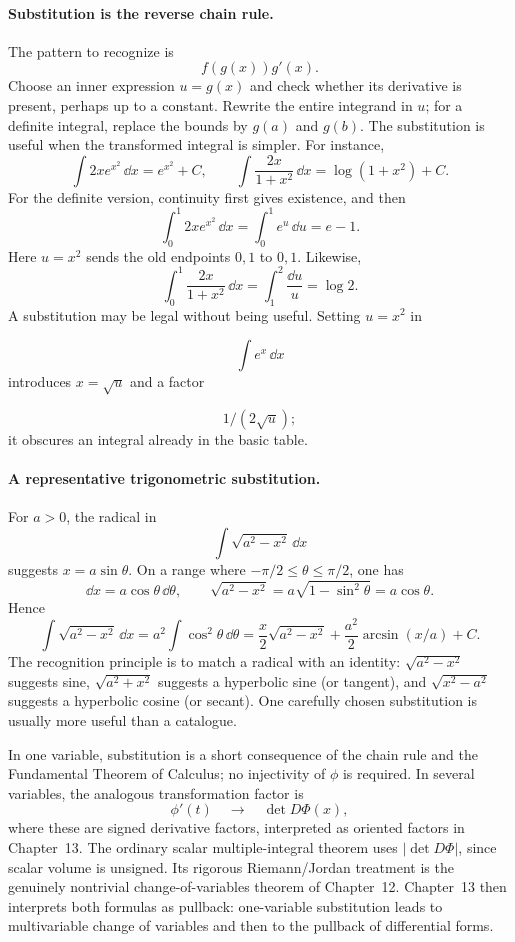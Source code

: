 \paragraph{Substitution is the reverse chain rule.}
The pattern to recognize is
\[
f(g(x))g'(x).
\]
Choose an inner expression $u=g(x)$ and check whether its derivative is
present, perhaps up to a constant. Rewrite the entire integrand in $u$;
for a definite integral, replace the bounds by $g(a)$ and $g(b)$. The
substitution is useful when the transformed integral is simpler.
For instance,
\[
\int 2x e^{x^2}\,\dd x=e^{x^2}+C,
\qquad
\int\frac{2x}{1+x^2}\,\dd x=\log(1+x^2)+C.
\]
For the definite version, continuity first gives existence, and then
\[
\int_0^1 2x e^{x^2}\,\dd x
=\int_0^1 e^u\,\dd u
=e-1.
\]
Here \(u=x^2\) sends the old endpoints \(0,1\) to \(0,1\). Likewise,
\[
\int_0^1\frac{2x}{1+x^2}\,\dd x
=\int_1^2\frac{\dd u}{u}
=\log2.
\]
A substitution may be legal without being useful. Setting \(u=x^2\) in

\[
\int e^x\,\dd x
\]
 introduces \(x=\sqrt u\) and a factor

\[
1/(2\sqrt u);
\]
 it obscures an integral already in the basic table.

\paragraph{A representative trigonometric substitution.}
For \(a>0\), the radical in
\[
\int\sqrt{a^2-x^2}\,\dd x
\]
suggests \(x=a\sin\theta\). On a range where
\(-\pi/2\leq\theta\leq\pi/2\), one has
\[
\dd x=a\cos\theta\,\dd\theta,
\qquad
\sqrt{a^2-x^2}
=a\sqrt{1-\sin^2\theta}=a\cos\theta.
\]
Hence
\[
\int\sqrt{a^2-x^2}\,\dd x
=a^2\int\cos^2\theta\,\dd\theta
=\frac{x}{2}\sqrt{a^2-x^2}
+\frac{a^2}{2}\arcsin(x/a)+C.
\]
The recognition principle is to match a radical with an identity:
\(\sqrt{a^2-x^2}\) suggests sine,
\(\sqrt{a^2+x^2}\) suggests a hyperbolic sine (or tangent), and
\(\sqrt{x^2-a^2}\) suggests a hyperbolic cosine (or secant). One carefully
chosen substitution is usually more useful than a catalogue.

\begin{remark}
In one variable, substitution is a short consequence of the chain rule and
the Fundamental Theorem of Calculus; no injectivity of \(\phi\) is required.
In several variables, the analogous transformation factor is
\[
\phi'(t)
\quad\longrightarrow\quad
\det D\Phi(x),
\]
where these are signed derivative factors, interpreted as oriented
factors in Chapter~13. The ordinary scalar multiple-integral theorem uses
$|\det D\Phi|$, since scalar volume is unsigned. Its rigorous
Riemann/Jordan treatment is the genuinely nontrivial
change-of-variables theorem of Chapter~12.  Chapter~13 then interprets both
formulas as pullback: one-variable substitution leads to multivariable
change of variables and then to the pullback of differential forms.
\end{remark}


